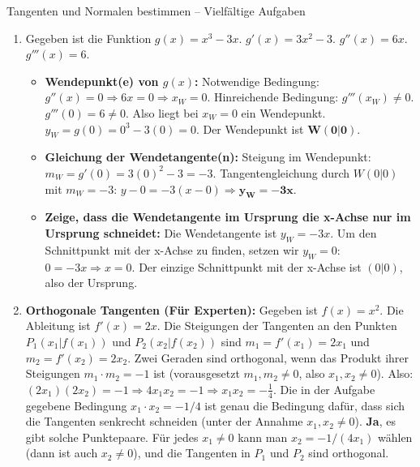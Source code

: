 \begin{loesungsumgebung}{Tangenten und Normalen bestimmen – Vielfältige Aufgaben}
\begin{enumerate}[label=(\alph*)]
    \item Gegeben ist die Funktion $g(x) = x^3 - 3x$.
    $g'(x) = 3x^2 - 3$.
    $g''(x) = 6x$.
    $g'''(x) = 6$.
    \begin{itemize}
        \item \textbf{Wendepunkt(e) von $g(x)$:}
        Notwendige Bedingung: $g''(x) = 0 \Rightarrow 6x = 0 \Rightarrow x_W = 0$.
        Hinreichende Bedingung: $g'''(x_W) \neq 0$. $g'''(0) = 6 \neq 0$.
        Also liegt bei $x_W=0$ ein Wendepunkt.
        $y_W = g(0) = 0^3 - 3(0) = 0$.
        Der Wendepunkt ist $\mathbf{W(0|0)}$.
        \item \textbf{Gleichung der Wendetangente(n):}
        Steigung im Wendepunkt: $m_W = g'(0) = 3(0)^2 - 3 = -3$.
        Tangentengleichung durch $W(0|0)$ mit $m_W = -3$:
        $y - 0 = -3(x - 0) \Rightarrow \mathbf{y_W = -3x}$.
        \item \textbf{Zeige, dass die Wendetangente im Ursprung die x-Achse nur im Ursprung schneidet:}
        Die Wendetangente ist $y_W = -3x$. Um den Schnittpunkt mit der x-Achse zu finden, setzen wir $y_W=0$:
        $0 = -3x \Rightarrow x = 0$.
        Der einzige Schnittpunkt mit der x-Achse ist $(0|0)$, also der Ursprung.
    \end{itemize}

    \item \textbf{Orthogonale Tangenten (Für Experten):}
    Gegeben ist $f(x) = x^2$. Die Ableitung ist $f'(x) = 2x$.
    Die Steigungen der Tangenten an den Punkten $P_1(x_1|f(x_1))$ und $P_2(x_2|f(x_2))$ sind $m_1 = f'(x_1) = 2x_1$ und $m_2 = f'(x_2) = 2x_2$.
    Zwei Geraden sind orthogonal, wenn das Produkt ihrer Steigungen $m_1 \cdot m_2 = -1$ ist (vorausgesetzt $m_1, m_2 \neq 0$, also $x_1, x_2 \neq 0$).
    Also: $(2x_1)(2x_2) = -1 \Rightarrow 4x_1x_2 = -1 \Rightarrow x_1x_2 = -\frac{1}{4}$.
    Die in der Aufgabe gegebene Bedingung $x_1 \cdot x_2 = -1/4$ ist genau die Bedingung dafür, dass sich die Tangenten senkrecht schneiden (unter der Annahme $x_1, x_2 \neq 0$).
    \textbf{Ja}, es gibt solche Punktepaare. Für jedes $x_1 \neq 0$ kann man $x_2 = -1/(4x_1)$ wählen (dann ist auch $x_2 \neq 0$), und die Tangenten in $P_1$ und $P_2$ sind orthogonal.


\end{enumerate}
\end{loesungsumgebung}
